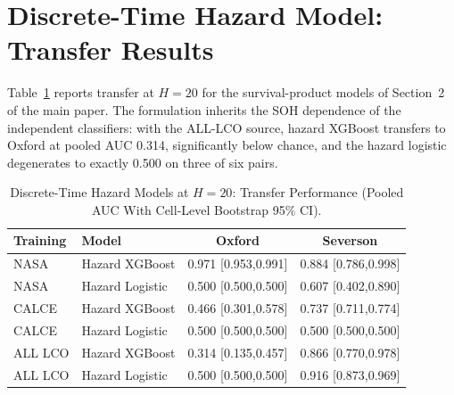 \documentclass[11pt,a4paper]{article}
\begin{document}
\section{Discrete-Time Hazard Model: Transfer Results}
Table~\ref{tab:s_hazard} reports transfer at $H{=}20$ for the survival-product models of Section~2 of the main paper. The formulation inherits the SOH dependence of the independent classifiers: with the ALL-LCO source, hazard XGBoost transfers to Oxford at pooled AUC 0.314, significantly below chance, and the hazard logistic degenerates to exactly 0.500 on three of six pairs.
\begin{table}[!t]
\caption{Discrete-Time Hazard Models at $H{=}20$: Transfer Performance (Pooled AUC With Cell-Level Bootstrap 95\% CI).}
\label{tab:s_hazard}
\centering\footnotesize\setlength{\tabcolsep}{3pt}
\begin{tabular}{llcc}
\toprule
\textbf{Training} & \textbf{Model} & \textbf{Oxford} & \textbf{Severson}\\
\midrule
NASA & Hazard XGBoost & 0.971 [0.953,0.991] & 0.884 [0.786,0.998]\\
NASA & Hazard Logistic & 0.500 [0.500,0.500] & 0.607 [0.402,0.890]\\
CALCE & Hazard XGBoost & 0.466 [0.301,0.578] & 0.737 [0.711,0.774]\\
CALCE & Hazard Logistic & 0.500 [0.500,0.500] & 0.500 [0.500,0.500]\\
ALL LCO & Hazard XGBoost & 0.314 [0.135,0.457] & 0.866 [0.770,0.978]\\
ALL LCO & Hazard Logistic & 0.500 [0.500,0.500] & 0.916 [0.873,0.969]\\
\bottomrule
\end{tabular}
\end{table}
\end{document}
